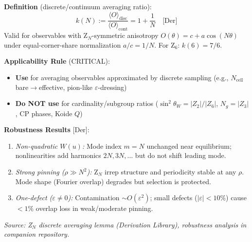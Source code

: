 %

\begin{tcolorbox}[colback=green!5!white, colframe=green!50!black,
                  title=\textbf{Z$_N$ k-channel: Definition, Applicability \& Robustness}]
\label{box:zn-kchannel-robustness}

\textbf{Definition} (discrete/continuum averaging ratio):
\begin{equation}
k(N) := \frac{\langle O \rangle_{\text{disc}}}{\langle O \rangle_{\text{cont}}}
= 1 + \frac{1}{N} \quad \text{[Der]}
\end{equation}
Valid for observables with Z$_N$-symmetric anisotropy $O(\theta) = c + a\cos(N\theta)$
under equal-corner-share normalization $a/c = 1/N$.
For Z$_6$: $k(6) = 7/6$.

\vspace{0.3em}
\textbf{Applicability Rule} (CRITICAL):
\begin{itemize}[nosep,leftmargin=1.5em]
\item[\checkmark] \textbf{Use} for averaging observables approximated by discrete sampling
      (e.g., $N_{\text{cell}}$ bare$\to$effective, pion-like $\varepsilon$-dressing)
\item[$\times$] \textbf{Do NOT use} for cardinality/subgroup ratios
      ($\sin^2\theta_W = |Z_2|/|Z_6|$, $N_g = |Z_3|$, CP phases, Koide $Q$)
\end{itemize}

\vspace{0.3em}
\textbf{Robustness Results} [Der]:
\begin{enumerate}[nosep,leftmargin=1.5em]
\item \textit{Non-quadratic $W(u)$:} Mode index $m=N$ unchanged near equilibrium;
      nonlinearities add harmonics $2N, 3N, \ldots$ but do not shift leading mode.
\item \textit{Strong pinning ($\rho \gg N^2$):} Z$_N$ irrep structure and periodicity
      stable at any $\rho$. Mode shape (Fourier overlap) degrades but selection is protected.
\item \textit{One-defect ($\varepsilon \ne 0$):} Contamination $\sim O(\varepsilon^2)$;
      small defects ($|\varepsilon| < 10\%$) cause $<1\%$ overlap loss in weak/moderate pinning.
\end{enumerate}

\vspace{0.3em}
\textit{Source: Z$_N$ discrete averaging lemma (Derivation Library), robustness analysis in companion repository.}

\end{tcolorbox}
